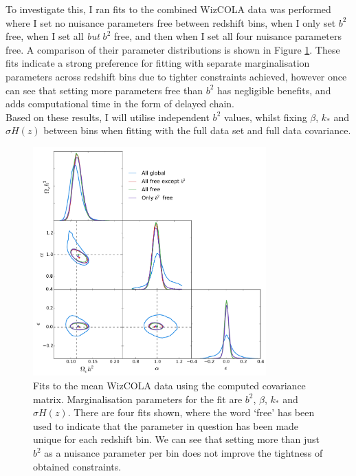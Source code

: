 \documentclass[titlesmallcaps, examinerscopy, copyrightpage]{uqthesis}
\begin{document}
To investigate this, I ran fits to the combined WizCOLA data was performed where I set no nuisance parameters free between redshift bins, when I only set $b^2$ free, when I set all \textit{but} $b^2$ free, and then when I set all four nuisance parameters free. A comparison of their parameter distributions is shown in Figure \ref{fig:wizcolaAllNormalCovCombined}. These fits indicate a strong preference for fitting with separate marginalisation parameters across redshift bins due to tighter constraints achieved, however once can see that setting more parameters free than $b^2$ has negligible benefits, and adds computational time in the form of delayed chain.\\

Based on these results, I will utilise independent $b^2$ values, whilst fixing $\beta$, $k_*$ and $\sigma H(z)$ between bins when fitting with the full data set and full data covariance.


\begin{figure}[h!]
  \begin{center}
    \includegraphics[width=0.8\textwidth]{images/wizcolaAllNormalCovCombined.pdf}
  \end{center}
  \caption{Fits to the mean WizCOLA data using the computed covariance matrix. Marginalisation parameters for the fit are $b^2$, $\beta$, $k_*$ and $\sigma H(z)$. There are four fits shown, where the word `free' has been used to indicate that the parameter in question has been made unique for each redshift bin. We can see that setting more than just $b^2$ as a nuisance parameter per bin does not improve the tightness of obtained constraints.}
  \label{fig:wizcolaAllNormalCovCombined}
\end{figure}
\end{document}
